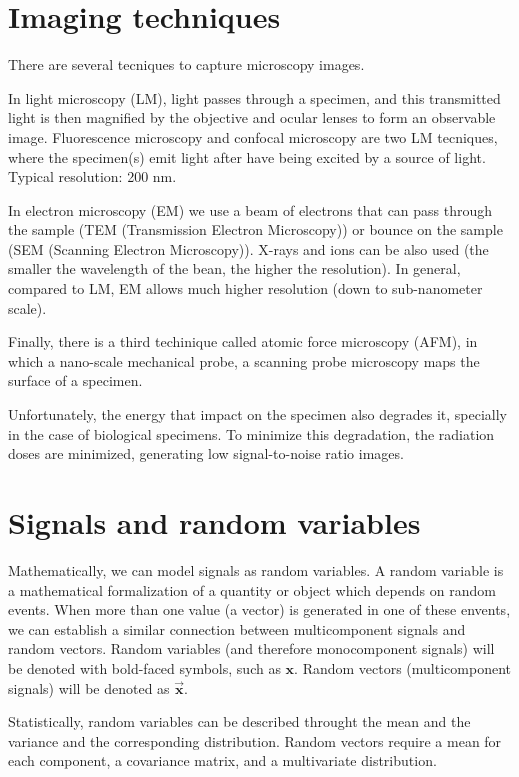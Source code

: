 \documentclass{article}
\begin{document}

\tableofcontents
\clearpage
\newpage

\section{Imaging techniques}

There are several tecniques to capture microscopy images.

In light microscopy (LM), light passes through a specimen, and this
transmitted light is then magnified by the objective and ocular lenses
to form an observable image. Fluorescence microscopy and confocal
microscopy are two LM tecniques, where the specimen(s) emit light
after have being excited by a source of light. Typical resolution: 200
nm.

In electron microscopy (EM) we use a beam of electrons that can pass
through the sample (TEM (Transmission Electron Microscopy)) or bounce
on the sample (SEM (Scanning Electron Microscopy)). X-rays and ions
can be also used (the smaller the wavelength of the bean, the higher
the resolution). In general, compared to LM, EM allows much higher
resolution (down to sub-nanometer scale).

Finally, there is a third techinique called atomic force microscopy
(AFM), in which a nano-scale mechanical probe, a scanning probe
microscopy maps the surface of a specimen.

Unfortunately, the energy that impact on the specimen also degrades
it, specially in the case of biological specimens. To minimize this
degradation, the radiation doses are minimized, generating low
signal-to-noise ratio images.


\section{Signals and random variables}
Mathematically, we can model signals as random variables. A random
variable is a mathematical formalization of a quantity or object which
depends on random events. When more than one value (a vector) is
generated in one of these envents, we can establish a similar
connection between multicomponent signals and random vectors. Random
variables (and therefore monocomponent signals) will be denoted with
bold-faced symbols, such as $\mathbf{x}$. Random vectors
(multicomponent signals) will be denoted as
$\overrightarrow{\mathbf{x}}$.

Statistically, random variables can be described throught the mean and
the variance and the corresponding distribution. Random vectors
require a mean for each component, a covariance matrix, and a
multivariate distribution.
\end{document}

